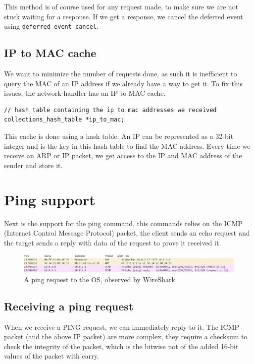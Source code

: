 This method is of course used for any request made, to make sure we are not stuck waiting for a response. If we get a response, we cancel the deferred event using \verb|deferred_event_cancel|.

\subsection{IP to MAC cache}

We want to minimize the number of requests done, as such it is inefficient to query the MAC of an IP address if we already have a way to get it. To fix this issues, the network handler has an IP to MAC cache.
\begin{lstlisting}
// hash table containing the ip to mac addresses we received
collections_hash_table *ip_to_mac;
\end{lstlisting}
This cache is done using a hash table. An IP can be represented as a 32-bit integer and is the key in this hash table to find the MAC address. Every time we receive an ARP or IP packet, we get access to the IP and MAC address of the sender and store it.

\section{Ping support}

Next is the support for the ping command, this commands relies on the ICMP (Internet Control Message Protocol) packet, the client sends an echo request and the target sends a reply with data of the request to prove it received it.

\begin{figure}
    \centering
    \includegraphics[scale=0.45]{images/network/ping_request.png}
    \caption{A ping request to the OS, observed by WireShark}
\end{figure}

\subsection{Receiving a ping request}

When we receive a PING request, we can immediately reply to it. The ICMP packet (and the above IP packet) are more complex, they require a checksum to check the integrity of the packet, which is the bitwise not of the added 16-bit values of the packet with carry.

